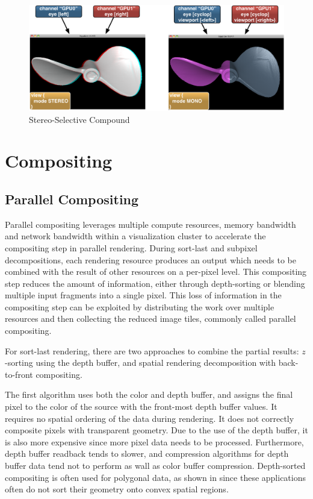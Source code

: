 \begin{figure}[h!t]\center
 \includegraphics[width=\columnwidth]{images/stereoSwitch}
 {\caption{\label{fStereoSwitch}Stereo-Selective Compound}}
\end{figure}

\chapter{Compositing}\label{sCompositing}

\section{Parallel Compositing}

Parallel compositing leverages multiple compute resources, memory bandwidth and
network bandwidth within a visualization cluster to accelerate the compositing
step in parallel rendering. During sort-last and subpixel decompositions, each
rendering resource produces an output which needs to be combined with the
result of other resources on a per-pixel level. This compositing step reduces
the amount of information, either through depth-sorting or blending multiple
input fragments into a single pixel. This loss of information in the
compositing step can be exploited by distributing the work over multiple
resources and then collecting the reduced image tiles, commonly called parallel
compositing.

For sort-last rendering, there are two approaches to combine the partial
results: $z$-sorting using the depth buffer, and spatial rendering
decomposition with back-to-front compositing.

The first algorithm uses both the color and depth buffer, and assigns the final
pixel to the color of the source with the front-most depth buffer values. It
requires no spatial ordering of the data during rendering. It does not
correctly composite pixels with transparent geometry. Due to the use of the
depth buffer, it is also more expensive since more pixel data needs to be
processed. Furthermore, depth buffer readback tends to slower, and compression
algorithms for depth buffer data tend not to perform as wall as color buffer
compression. Depth-sorted compositing is often used for polygonal data, as
shown in  since these applications often do not sort their geometry
onto convex spatial regions.


